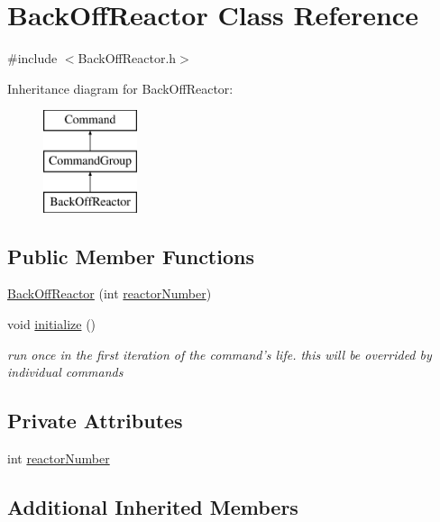 \hypertarget{classBackOffReactor}{\section{Back\-Off\-Reactor Class Reference}
\label{classBackOffReactor}
}


{\ttfamily \#include $<$Back\-Off\-Reactor.\-h$>$}

Inheritance diagram for Back\-Off\-Reactor\-:\begin{figure}[H]
\begin{center}
\leavevmode
\includegraphics[height=3.000000cm]{classBackOffReactor}
\end{center}
\end{figure}
\subsection*{Public Member Functions}
\begin{DoxyCompactItemize}
\item 
\hyperlink{classBackOffReactor_a4c7c2c714dcdab2d80f1ba851beab5b8}{Back\-Off\-Reactor} (int \hyperlink{classBackOffReactor_ae5b8f5714a059f48405fd6ab7b3de851}{reactor\-Number})
\item 
void \hyperlink{classBackOffReactor_a8e18c33979bac064a061382c8890a6b7}{initialize} ()
\begin{DoxyCompactList}\small\item\em run once in the first iteration of the command's life. this will be overrided by individual commands \end{DoxyCompactList}\end{DoxyCompactItemize}
\subsection*{Private Attributes}
\begin{DoxyCompactItemize}
\item 
int \hyperlink{classBackOffReactor_ae5b8f5714a059f48405fd6ab7b3de851}{reactor\-Number}
\end{DoxyCompactItemize}
\subsection*{Additional Inherited Members}


